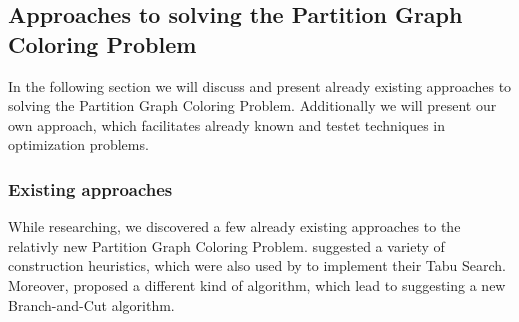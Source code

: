 \documentclass[paper=a4,fontsize=12pt]{scrartcl}
\begin{document}

\subsection{Approaches to solving the Partition Graph Coloring Problem}


In the following section we will discuss and present already existing approaches to solving the Partition Graph Coloring Problem. Additionally we will present our own approach, which facilitates already known and testet techniques in optimization problems.


\subsubsection{Existing approaches}


While researching, we discovered a few already existing approaches to the relativly new Partition Graph Coloring Problem. \citet*{Li2000} suggested a variety of construction heuristics, which were also used by \citet*{Noronha2006} to implement their Tabu Search. Moreover, \citet*{Lu2010} proposed a different kind of algorithm, which lead to \citet*{Palladino2011} suggesting a new Branch-and-Cut algorithm.

\end{document}
